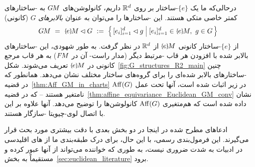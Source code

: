 درحالی‌که ما یک $\{e\}$-ساختار بر روی $\mathbb{R}^d$ داریم، کانولوشن‌های $G\mkern-1.4muM$ به -ساختارهای کمتر خاصی متکی هستند.
این -ساختارها را می‌توان به عنوان \emph{بالابرهای} $G$ (کانونی)
\begin{align}\label{eq:G_lifted_G_structure_Rd}
	\GM\ =\ \eM\lhd G\ :=\ \pig\{\, [e_i]_{i=1}^d \lhd g \;\pig|\; [e_i]_{i=1}^d \in \eM,\ g\in G \,\pig\}
\end{align}
از $\{e\}$-ساختار کانونی $\eM$ از $\mathbb{R}^d$ در نظر گرفت.
به طور شهودی، این -ساختارهای بالابر شده با افزودن هر قاب -مرتبط دیگر (مدار راست- آن در $F\mkern-1.5muM$) به هر قاب مرجع کانونی در $\eM$ تعریف می‌شوند.
شکل~\ref{fig:G_structures_R2_main} چنین -ساختارهای بالابر شده‌ای را برای گروه‌های ساختار مختلف نشان می‌دهد.
همانطور که در قضیه~\ref{thm:Aff_GM_in_charts} در زیر اثبات شده است، آنها تحت عمل $\operatorname{Aff}(G)$ نامتغیر هستند -- که در قضیه~\ref{thm:affine_equivariance_Euclidean_GM_conv} نشان داده شده است که هم‌متغیری $\operatorname{Aff}(G)$ کانولوشن‌ها را توضیح می‌دهد.
آنها علاوه بر این با اتصال لوی-چیویتا -سازگار هستند.


ادعاهای مطرح شده در اینجا در دو بخش بعدی با دقت بیشتری مورد بحث قرار می‌گیرند.
این فرمول‌بندی رسمی، با این حال، برای درک طبقه‌بندی ما از های اقلیدسی در ادبیات به شدت ضروری نیست، به طوری که خواننده می‌تواند از آنها عبور کرده و مستقیماً به بخش~\ref{sec:euclidean_literature} برود.